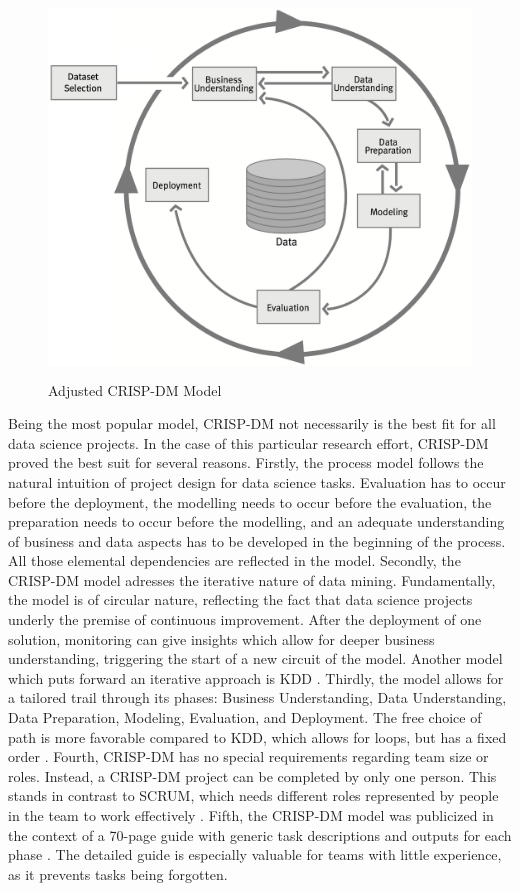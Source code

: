 \begin{figure}[ht]
	\centering
	\includegraphics[height=10cm]{Bilder/Research_Model.png}
	\caption{Adjusted CRISP-DM Model}
	\label{fig:CRISM-DM}
\end{figure}

Being the most popular model, \ac{CRISP-DM} not necessarily is the best fit for all data science projects. In the case of this particular research effort, \ac{CRISP-DM} proved the best suit for several reasons.
Firstly, the process model follows the natural intuition of project design for data science tasks. Evaluation has to occur before the deployment, the modelling needs to occur before the evaluation, the preparation needs to occur before the modelling, and an adequate understanding of business and data aspects has to be developed in the beginning of the process. All those elemental dependencies are reflected in the model.
Secondly, the \ac{CRISP-DM} model adresses the iterative nature of data mining. Fundamentally, the model is of circular nature, reflecting the fact that data science projects underly the premise of continuous improvement. After the deployment of one solution, monitoring can give insights which allow for deeper business understanding, triggering the start of a new circuit of the model. Another model which puts forward an iterative approach is \ac{KDD} \cite{KDD}.
Thirdly, the model allows for a tailored trail through its phases: Business Understanding, Data Understanding, Data Preparation, Modeling, Evaluation, and Deployment. The free choice of path is more favorable compared to \ac{KDD}, which allows for loops, but has a fixed order \cite{KDD}.
Fourth, \ac{CRISP-DM} has no special requirements regarding team size or roles. Instead, a \ac{CRISP-DM} project can be completed by only one person. This stands in contrast to SCRUM, which needs different roles represented by people in the team to work effectively \cite{SCRUMSolo}. 
Fifth, the \ac{CRISP-DM} model was publicized in the context of a 70-page guide with generic task descriptions and outputs for each phase \cite{CRISPDM2000}. The detailed guide is especially valuable for teams with little experience, as it prevents tasks being forgotten.

